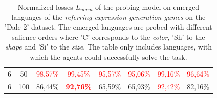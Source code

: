 \begin{table}[ht]
\begin{tabular}{cc|c|c|c|c|c|c}
        {6} & {50}  & \textcolor{red}{98,57\%} & \textcolor{red}{99,45\%}          & \textcolor{red}{95,57\%} & \textcolor{red}{95,06\%} & \textcolor{red}{99,16\%} & \textcolor{red}{96,64\%} \\
        {6} & {100} & {86,44\%}                & \textcolor{red}{\textbf{92,76\%}} & {65,59\%}                & {65,93\%}                & \textcolor{red}{92,42\%} & {82,16\%}                \\
        \bottomrule
    \end{tabular}
    \caption{Normalized losses $L_{norm}$ of the probing model on emerged languages of the \emph{referring expression generation games} on the 'Dale-2' dataset. The emerged languages are probed with different salience orders where 'C' corresponds to the \emph{color}, 'Sh' to the \emph{shape} and 'Si' to the \emph{size}. The table only includes languages, with which the agents could successfully solve the task.}
    \label{tab:probing:re-generator:dale-2}
\end{table}

